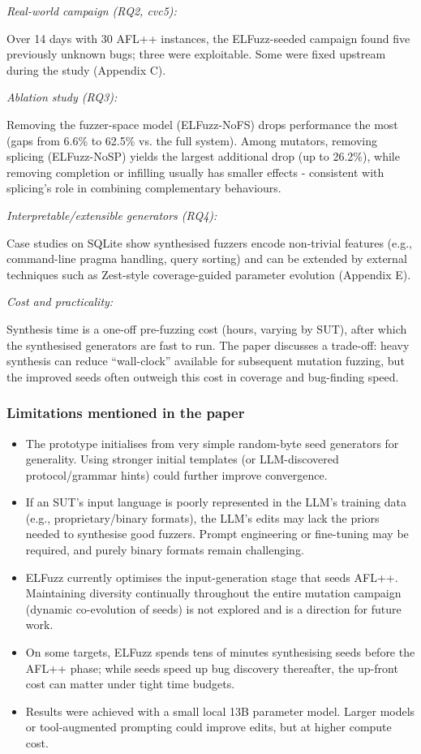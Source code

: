 \lilspace
\textit{\sloppy Real-world campaign (RQ2, cvc5):}

Over 14 days with 30 AFL++ instances, the ELFuzz-seeded campaign found five previously unknown bugs; three were exploitable. Some were fixed upstream during the study (Appendix C).

\lilspace
\textit{Ablation study (RQ3):}

Removing the fuzzer-space model (ELFuzz-NoFS) drops performance the most (gaps from 6.6\% to 62.5\% vs. the full system). Among mutators, removing splicing (ELFuzz-NoSP) yields the largest additional drop (up to 26.2\%), while removing completion or infilling usually has smaller effects - consistent with splicing's role in combining complementary behaviours.

\lilspace
\textit{Interpretable/extensible generators (RQ4):}

Case studies on SQLite show synthesised fuzzers encode non-trivial features (e.g., command-line pragma handling, query sorting) and can be extended by external techniques such as Zest-style coverage-guided parameter evolution (Appendix E).

\lilspace
\textit{Cost and practicality:}

Synthesis time is a one-off pre-fuzzing cost (hours, varying by SUT), after which the synthesised generators are fast to run. The paper discusses a trade-off: heavy synthesis can reduce ``wall-clock'' available for subsequent mutation fuzzing, but the improved seeds often outweigh this cost in coverage and bug-finding speed.

\subsubsection{Limitations mentioned in the paper}

\begin{itemize}
    \item The prototype initialises from very simple random-byte seed generators for generality. Using stronger initial templates (or LLM-discovered protocol/grammar hints) could further improve convergence.
    \item If an SUT's input language is poorly represented in the LLM's training data (e.g., proprietary/binary formats), the LLM's edits may lack the priors needed to synthesise good fuzzers. Prompt engineering or fine-tuning may be required, and purely binary formats remain challenging.
    \item  ELFuzz currently optimises the input-generation stage that seeds AFL++. Maintaining diversity continually throughout the entire mutation campaign (dynamic co-evolution of seeds) is not explored and is a direction for future work.
    \item On some targets, ELFuzz spends tens of minutes synthesising seeds before the AFL++ phase; while seeds speed up bug discovery thereafter, the up-front cost can matter under tight time budgets.
    \item \sloppy Results were achieved with a small local 13B parameter model. Larger models or tool-augmented prompting could improve edits, but at higher compute cost.
\end{itemize}

